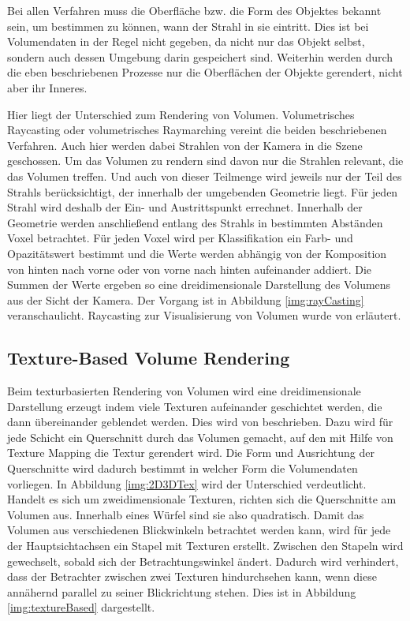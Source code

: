 Bei allen Verfahren muss die Oberfläche bzw. die Form des Objektes bekannt sein, um bestimmen zu können, wann der Strahl in sie eintritt. Dies ist bei Volumendaten in der Regel nicht gegeben, da nicht nur das Objekt selbst, sondern auch dessen Umgebung darin gespeichert sind. Weiterhin werden durch die eben beschriebenen Prozesse nur die Oberflächen der Objekte gerendert, nicht aber ihr Inneres.

Hier liegt der Unterschied zum Rendering von Volumen. Volumetrisches Raycasting oder volumetrisches Raymarching vereint die beiden beschriebenen Verfahren. Auch hier werden dabei Strahlen von der Kamera in die Szene geschossen. Um das Volumen zu rendern sind davon nur die Strahlen relevant, die das Volumen treffen. Und auch von dieser Teilmenge wird jeweils nur der Teil des Strahls berücksichtigt, der innerhalb der umgebenden Geometrie liegt. Für jeden Strahl wird deshalb der Ein- und Austrittspunkt errechnet. Innerhalb der Geometrie werden anschließend entlang des Strahls in bestimmten Abständen Voxel betrachtet. Für jeden Voxel wird per Klassifikation ein Farb- und Opazitätswert bestimmt und die Werte werden abhängig von der Komposition von hinten nach vorne oder von vorne nach hinten aufeinander addiert. Die Summen der Werte ergeben so eine dreidimensionale Darstellung des Volumens aus der Sicht der Kamera. Der Vorgang ist in Abbildung \ref{img:rayCasting} veranschaulicht.
Raycasting zur Visualisierung von Volumen wurde von \cite{Weiskopf06} erläutert.


\subsection{Texture-Based Volume Rendering}

Beim texturbasierten Rendering von Volumen wird eine dreidimensionale Darstellung erzeugt indem viele Texturen aufeinander geschichtet werden, die dann übereinander geblendet werden. Dies wird von \cite{kniss02} beschrieben. Dazu wird für jede Schicht ein Querschnitt durch das Volumen gemacht, auf den mit Hilfe von Texture Mapping die Textur gerendert wird.
Die Form und Ausrichtung der Querschnitte wird dadurch bestimmt in welcher Form die Volumendaten vorliegen. In Abbildung \ref{img:2D3DTex} wird der Unterschied verdeutlicht. Handelt es sich um zweidimensionale Texturen,  richten sich die Querschnitte am Volumen aus. Innerhalb eines Würfel sind sie also quadratisch. Damit das Volumen aus verschiedenen Blickwinkeln betrachtet werden kann, wird für jede der Hauptsichtachsen ein Stapel mit Texturen erstellt. Zwischen den Stapeln wird gewechselt, sobald sich der Betrachtungswinkel ändert. Dadurch wird verhindert, dass der Betrachter zwischen zwei Texturen hindurchsehen kann, wenn diese annähernd parallel zu seiner Blickrichtung stehen. Dies ist in Abbildung \ref{img:textureBased} dargestellt.

